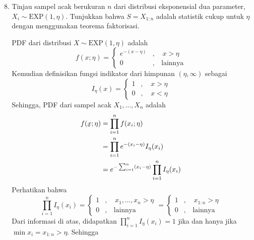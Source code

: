 \documentclass{exam}
\begin{document}

\begin{enumerate}
    \setcounter{enumi}{7}
    \item Tinjau sampel acak berukuran $n$ dari distribusi eksponensial dua parameter, $X_i\sim\text{EXP}(1,\eta)$. Tunjukkan bahwa $S=X_{1:n}$ adalah statistik cukup untuk $\eta$ dengan menggunakan teorema faktorisasi.
    \begin{solution}
        PDF dari distribusi $X\sim\text{EXP}(1,\eta)$ adalah
        \begin{equation*}
            f(x;\eta) = \begin{cases}
                e^{-(x-\eta)}&,\quad x>\eta\\
                0&,\quad\text{lainnya}
            \end{cases}
        \end{equation*}
        Kemudian definisikan fungsi indikator dari himpunan $(\eta,\infty)$ sebagai
        \begin{equation*}
            I_\eta(x) = \begin{cases}
                1&,\quad x>\eta\\
                0&,\quad x<\eta
            \end{cases}
        \end{equation*}
        Sehingga, PDF dari sampel acak $X_1,\dots,X_n$ adalah
        \begin{align*}
            f(\underaccent{\tilde}{x};\eta) &= \prod_{i=1}^n f(x_i;\eta)\\
            &= \prod_{i=1}^n e^{-(x_i-\eta)}I_\eta(x_i)\\
            &= e^{-\sum_{i=1}^n(x_i-\eta)}\prod_{i=1}^n I_\eta(x_i)\\
        \end{align*}
        Perhatikan bahwa 
        \begin{equation*}
            \prod_{i=1}^n I_\eta(x_i) = \begin{cases}
                1&,\quad x_1,\dots,x_n>\eta\\
                0&,\quad\text{lainnya}
            \end{cases}
            =\begin{cases}
                1&,\quad x_{1:n}>\eta\\
                0&,\quad\text{lainnya}
            \end{cases}
        \end{equation*}
        Dari informasi di atas, didapatkan $\displaystyle\prod_{i=1}^n I_\eta(x_i)=1$ jika dan hanya jika $\min x_i=x_{1:n}>\eta$. Sehingga 

\end{solution}
\end{enumerate}
\end{document}
